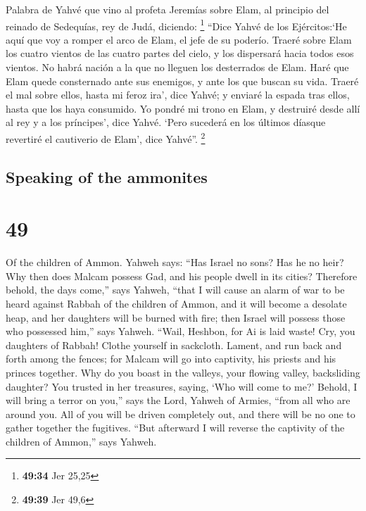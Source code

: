 \begin{paracol}{2}
 Palabra de Yahvé que vino al profeta Jeremías sobre
Elam, al principio del reinado de Sedequías, rey de Judá, diciendo:
\footnote{\textbf{49:34} Jer 25,25}  ``Dice Yahvé de los
Ejércitos:`He aquí que voy a romper el arco de Elam, el jefe de su
poderío.  Traeré sobre Elam los cuatro vientos de las
cuatro partes del cielo, y los dispersará hacia todos esos vientos. No
habrá nación a la que no lleguen los desterrados de Elam.
 Haré que Elam quede consternado ante sus enemigos, y
ante los que buscan su vida. Traeré el mal sobre ellos, hasta mi feroz
ira', dice Yahvé; y enviaré la espada tras ellos, hasta que los haya
consumido.  Yo pondré mi trono en Elam, y destruiré desde
allí al rey y a los príncipes', dice Yahvé.  `Pero
sucederá en los últimos díasque revertiré el cautiverio de Elam', dice
Yahvé''. \footnote{\textbf{49:39} Jer 49,6}

\switchcolumn
\begin{otherlanguage}{english}

\hypertarget{speaking-of-the-ammonites}{%
\subsection{Speaking of the ammonites}\label{speaking-of-the-ammonites}}

\hypertarget{section-97}{%
\section{49}\label{section-97}}

 Of the children of Ammon. Yahweh says: ``Has Israel no
sons? Has he no heir? Why then does Malcam possess Gad, and his people
dwell in its cities?  Therefore behold, the days come,''
says Yahweh, ``that I will cause an alarm of war to be heard against
Rabbah of the children of Ammon, and it will become a desolate heap, and
her daughters will be burned with fire; then Israel will possess those
who possessed him,'' says Yahweh.  ``Wail, Heshbon, for Ai
is laid waste! Cry, you daughters of Rabbah! Clothe yourself in
sackcloth. Lament, and run back and forth among the fences; for Malcam
will go into captivity, his priests and his princes together.
 Why do you boast in the valleys, your flowing valley,
backsliding daughter? You trusted in her treasures, saying, `Who will
come to me?'  Behold, I will bring a terror on you,'' says
the Lord, Yahweh of Armies, ``from all who are around you. All of you
will be driven completely out, and there will be no one to gather
together the fugitives.  ``But afterward I will reverse
the captivity of the children of Ammon,'' says Yahweh.


\end{otherlanguage}
\end{paracol}
